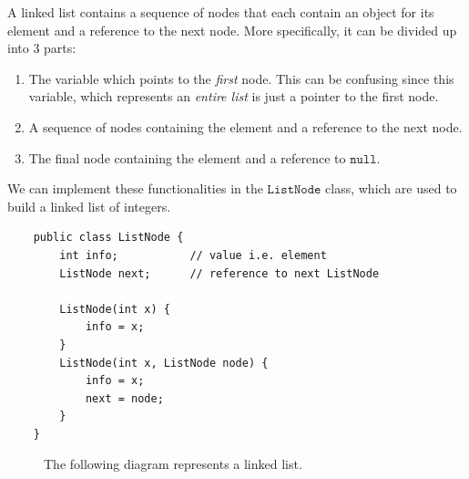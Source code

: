 \documentclass{article}
\begin{document}
    \begin{definition}
    A linked list contains a sequence of nodes that each contain an object for its element and a reference to the next node. More specifically, it can be divided up into 3 parts: 
    \begin{enumerate}
        \item The variable which points to the \textit{first} node. This can be confusing since this variable, which represents an \textit{entire list} is just a pointer to the first node. 
        \item A sequence of nodes containing the element and a reference to the next node. 
        \item The final node containing the element and a reference to $\texttt{null}$. 
    \end{enumerate}
    We can implement these functionalities in the $\texttt{ListNode}$ class, which are used to build a linked list of integers. 
    \begin{lstlisting}
    public class ListNode {
        int info;           // value i.e. element 
        ListNode next;      // reference to next ListNode
        
        ListNode(int x) {
            info = x; 
        }
        ListNode(int x, ListNode node) {
            info = x; 
            next = node; 
        }
    }
    \end{lstlisting}

    \begin{figure}[H]
      \centering 
      \caption{The following diagram represents a linked list. } 
      \label{fig:linked_list}
    \end{figure}


\end{definition}
\end{document}
